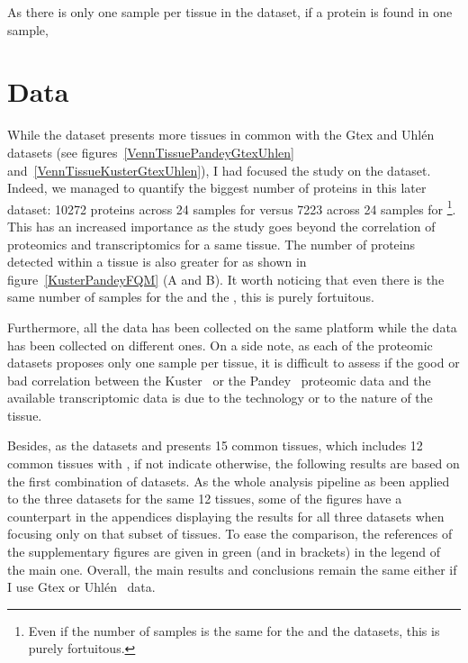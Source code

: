 As there is only one sample per tissue in the  dataset,
if a protein is found in one sample, 




\section{Data}\raggedbottom
\label{sec:IntegrationData}
While the  dataset presents more tissues in common
with the Gtex and Uhlén datasets (see figures~\ref{VennTissuePandeyGtexUhlen}
and~\ref{VennTissueKusterGtexUhlen}), I had focused the study on
the  dataset. Indeed, we managed to quantify the biggest number
of proteins in this later dataset: 10272 proteins across 24 samples for
 versus 7223 across 24 samples for \footnote{Even
if the number of samples is the same for the  and
the  datasets, this is purely fortuitous.}.
This has an increased importance as the study goes beyond the correlation of
proteomics and transcriptomics for a same tissue. The number of proteins
detected within a tissue is also greater for  as shown
in figure~\ref{KusterPandeyFQM} (A and B).
It worth noticing that even there is the same number of samples for the
 and the , this is purely fortuitous.

Furthermore, all the  data has been
collected on the same platform while the  data has been collected on
different ones. On a side note, as each of the proteomic datasets proposes
only one sample per tissue, it is difficult to assess if the good or bad
correlation between the Kuster \etal\ or the Pandey \etal\ proteomic data
and the available transcriptomic data is due to the technology or
to the nature of the tissue.

Besides, as the datasets  and  presents 15 common
tissues, which includes 12 common tissues with , if not
indicate otherwise, the following results are based on the first combination of
datasets. As the whole analysis pipeline as been applied to the three datasets for
the same 12 tissues, some of the figures have a counterpart in the
appendices displaying the results for all three datasets when focusing only on that
subset of tissues. To ease the comparison, the references of the supplementary
figures are given in green (and in brackets) in the legend of the main one.
Overall, the main results and conclusions remain the same either if I use Gtex or
Uhlén \etal\ data.


